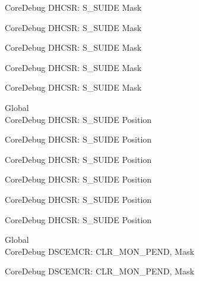 \begin{DoxyRefList}
\label{deprecated__deprecated000467}%
%
Core\+Debug DHCSR\+: S\+\_\+\+SUIDE Mask 

\label{deprecated__deprecated000569}%
%
Core\+Debug DHCSR\+: S\+\_\+\+SUIDE Mask 

\label{deprecated__deprecated000694}%
%
Core\+Debug DHCSR\+: S\+\_\+\+SUIDE Mask 

\label{deprecated__deprecated001145}%
%
Core\+Debug DHCSR\+: S\+\_\+\+SUIDE Mask 

\label{deprecated__deprecated001247}%
%
Core\+Debug DHCSR\+: S\+\_\+\+SUIDE Mask  
\item[Global \doxylink{group___c_m_s_i_s___s_c_b_gacff001d7e8c9665a1dc91018f2505d3d}{Core\+Debug\+\_\+\+DHCSR\+\_\+\+S\+\_\+\+SUIDE\+\_\+\+Pos} ]\hfill \\
\label{deprecated__deprecated000015}%
%
Core\+Debug DHCSR\+: S\+\_\+\+SUIDE Position 

\label{deprecated__deprecated000466}%
%
Core\+Debug DHCSR\+: S\+\_\+\+SUIDE Position 

\label{deprecated__deprecated000568}%
%
Core\+Debug DHCSR\+: S\+\_\+\+SUIDE Position 

\label{deprecated__deprecated000693}%
%
Core\+Debug DHCSR\+: S\+\_\+\+SUIDE Position 

\label{deprecated__deprecated001144}%
%
Core\+Debug DHCSR\+: S\+\_\+\+SUIDE Position 

\label{deprecated__deprecated001246}%
%
Core\+Debug DHCSR\+: S\+\_\+\+SUIDE Position  
\item[Global \doxylink{group___c_m_s_i_s___s_c_b_gacfb17801664286ab627a094d5fb3da20}{Core\+Debug\+\_\+\+DSCEMCR\+\_\+\+CLR\+\_\+\+MON\+\_\+\+PEND\+\_\+\+Msk} ]\hfill \\
\label{deprecated__deprecated000074}%
%
Core\+Debug DSCEMCR\+: CLR\+\_\+\+MON\+\_\+\+PEND, Mask 

\label{deprecated__deprecated000525}%
%
Core\+Debug DSCEMCR\+: CLR\+\_\+\+MON\+\_\+\+PEND, Mask 


\end{DoxyRefList}
